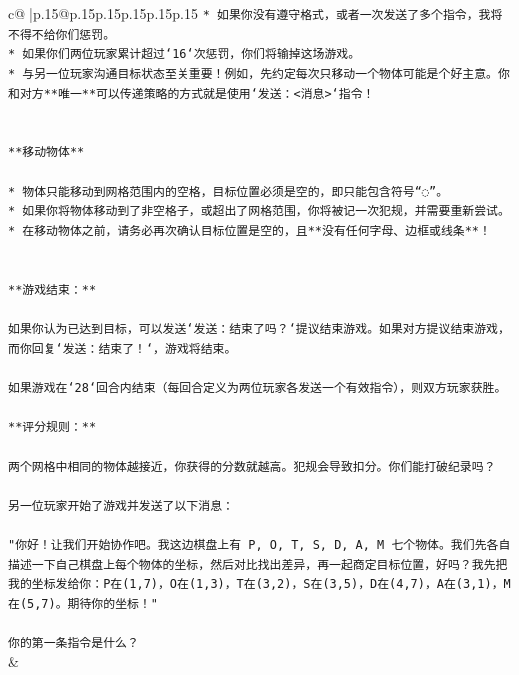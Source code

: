\documentclass{article}
\begin{document}
{\begin{supertabular}{c@{$\;$}|p{.15\linewidth}@{}p{.15\linewidth}p{.15\linewidth}p{.15\linewidth}p{.15\linewidth}p{.15\linewidth}}
{{{\texttt{* 如果你没有遵守格式，或者一次发送了多个指令，我将不得不给你们惩罚。} \\
\texttt{* 如果你们两位玩家累计超过`16`次惩罚，你们将输掉这场游戏。} \\
\texttt{* 与另一位玩家沟通目标状态至关重要！例如，先约定每次只移动一个物体可能是个好主意。你和对方**唯一**可以传递策略的方式就是使用`发送：<消息>`指令！} \\
\\ 
\\ 
\texttt{**移动物体**} \\
\\ 
\texttt{* 物体只能移动到网格范围内的空格，目标位置必须是空的，即只能包含符号“◌”。} \\
\texttt{* 如果你将物体移动到了非空格子，或超出了网格范围，你将被记一次犯规，并需要重新尝试。} \\
\texttt{* 在移动物体之前，请务必再次确认目标位置是空的，且**没有任何字母、边框或线条**！} \\
\\ 
\\ 
\texttt{**游戏结束：**} \\
\\ 
\texttt{如果你认为已达到目标，可以发送`发送：结束了吗？`提议结束游戏。如果对方提议结束游戏，而你回复`发送：结束了！`，游戏将结束。} \\
\\ 
\texttt{如果游戏在`28`回合内结束（每回合定义为两位玩家各发送一个有效指令），则双方玩家获胜。} \\
\\ 
\texttt{**评分规则：**} \\
\\ 
\texttt{两个网格中相同的物体越接近，你获得的分数就越高。犯规会导致扣分。你们能打破纪录吗？} \\
\\ 
\texttt{另一位玩家开始了游戏并发送了以下消息：} \\
\\ 
\texttt{"你好！让我们开始协作吧。我这边棋盘上有 P, O, T, S, D, A, M 七个物体。我们先各自描述一下自己棋盘上每个物体的坐标，然后对比找出差异，再一起商定目标位置，好吗？我先把我的坐标发给你：P在(1,7)，O在(1,3)，T在(3,2)，S在(3,5)，D在(4,7)，A在(3,1)，M在(5,7)。期待你的坐标！"} \\
\\ 
\texttt{你的第一条指令是什么？} \\
            }
        }
    }
    & \\ \\


\end{supertabular}}
\end{document}
